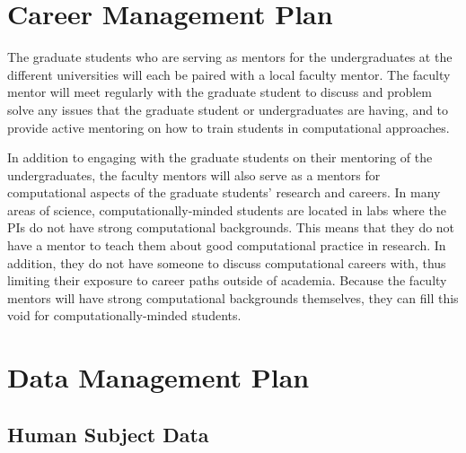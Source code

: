 \documentclass{proposalnsf}
\begin{document}
\section{Career Management Plan}

The graduate students who are serving as mentors for the
undergraduates at the different universities will each be paired with
a local faculty mentor. The faculty mentor will meet regularly with
the graduate student to discuss and problem solve any issues that the
graduate student or undergraduates are having, and to provide active
mentoring on how to train students in computational approaches.

In addition to engaging with the graduate students on their mentoring
of the undergraduates, the faculty mentors will also serve as a
mentors for computational aspects of the graduate students' research
and careers. In many areas of science, computationally-minded students
are located in labs where the PIs do not have strong computational
backgrounds. This means that they do not have a mentor to teach them
about good computational practice in research. In addition, they do
not have someone to discuss computational careers with, thus limiting
their exposure to career paths outside of academia. Because the
faculty mentors will have strong computational backgrounds themselves,
they can fill this void for computationally-minded students.



\appendix

\newpage
{}
\renewcommand{\thepage} {\footnotesize References\,---\,\arabic{page}}

\small




\newpage
{}
\renewcommand{\thepage} {\footnotesize Data Management\,---\,\arabic{page}}

\section*{Data Management Plan}

\subsection*{Human Subject Data}
\end{document}
